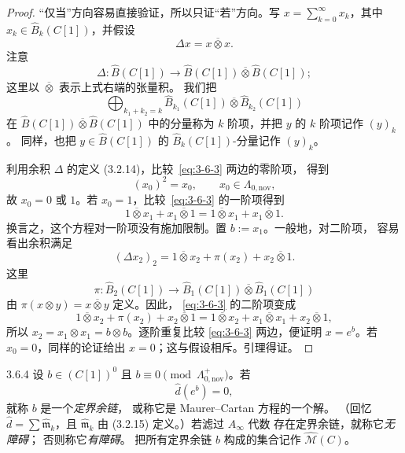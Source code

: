 \begin{proof}
“仅当”方向容易直接验证，所以只证“若”方向。写
$x=\sum_{k=0}^{\infty}x_k$，其中
$x_k\in\widehat B_k(C[1])$，并假设
\begin{equation}
  \Delta x=x\mathbin{\overline\otimes}x.
  \tag{3.6.3}\label{eq:3-6-3}
\end{equation}
注意
\[
  \Delta\colon\widehat B(C[1])\longrightarrow
  \widehat B(C[1])\mathbin{\overline\otimes}\widehat B(C[1]);
\]
这里以 $\mathbin{\overline\otimes}$ 表示上式右端的张量积。
我们把
\[
  \bigoplus_{k_1+k_2=k}
  \widehat B_{k_1}(C[1])
  \mathbin{\overline\otimes}\widehat B_{k_2}(C[1])
\]
在
$\widehat B(C[1])\mathbin{\overline\otimes}\widehat B(C[1])$
中的分量称为 $k$ 阶项，并把 $y$ 的 $k$ 阶项记作 $(y)_k$。
同样，也把 $y\in\widehat B(C[1])$ 的
$\widehat B_k(C[1])$-分量记作 $(y)_k$。

利用余积 $\Delta$ 的定义 (3.2.14)，比较~\eqref{eq:3-6-3} 两边的零阶项，
得到
\[
  (x_0)^2=x_0,\qquad x_0\in\Lambda_{0,\mathrm{nov}},
\]
故 $x_0=0$ 或 $1$。若 $x_0=1$，比较~\eqref{eq:3-6-3} 的一阶项得到
\[
  1\mathbin{\overline\otimes}x_1
  +x_1\mathbin{\overline\otimes}1
  =1\mathbin{\overline\otimes}x_1
  +x_1\mathbin{\overline\otimes}1.
\]
换言之，这个方程对一阶项没有施加限制。置 $b:=x_1$。一般地，对二阶项，
容易看出余积满足
\[
  (\Delta x_2)_2
  =1\mathbin{\overline\otimes}x_2+\pi(x_2)
   +x_2\mathbin{\overline\otimes}1.
\]
这里
\[
  \pi\colon\widehat B_2(C[1])\longrightarrow
  \widehat B_1(C[1])\mathbin{\overline\otimes}\widehat B_1(C[1])
\]
由 $\pi(x\otimes y)=x\mathbin{\overline\otimes}y$ 定义。因此，
\eqref{eq:3-6-3} 的二阶项变成
\[
  1\mathbin{\overline\otimes}x_2+\pi(x_2)
  +x_2\mathbin{\overline\otimes}1
  =1\mathbin{\overline\otimes}x_2
  +x_1\mathbin{\overline\otimes}x_1
  +x_2\mathbin{\overline\otimes}1,
\]
所以 $x_2=x_1\otimes x_1=b\otimes b$。逐阶重复比较
\eqref{eq:3-6-3} 两边，便证明 $x=e^b$。若 $x_0=0$，同样的论证给出
$x=0$；这与假设相斥。引理得证。
\end{proof}

\begin{definition}{3.6.4}\label{def:3-6-4}
设 $b\in(C[1])^0$ 且
$b\equiv0\pmod{\Lambda^+_{0,\mathrm{nov}}}$。若
\[
  \widehat d(e^b)=0,
\]
就称 $b$ 是一个\emph{定界余链}，
或称它是 Maurer--Cartan 方程的一个解。
（回忆 $\widehat d=\sum\widehat{\mathfrak m}_k$，且
$\widehat{\mathfrak m}_k$ 由 (3.2.15) 定义。）若滤过 $A_\infty$ 代数
存在定界余链，就称它\emph{无障碍}；
否则称它\emph{有障碍}。
把所有定界余链 $b$ 构成的集合记作 $\widehat{\mathcal M}(C)$。
\end{definition}

